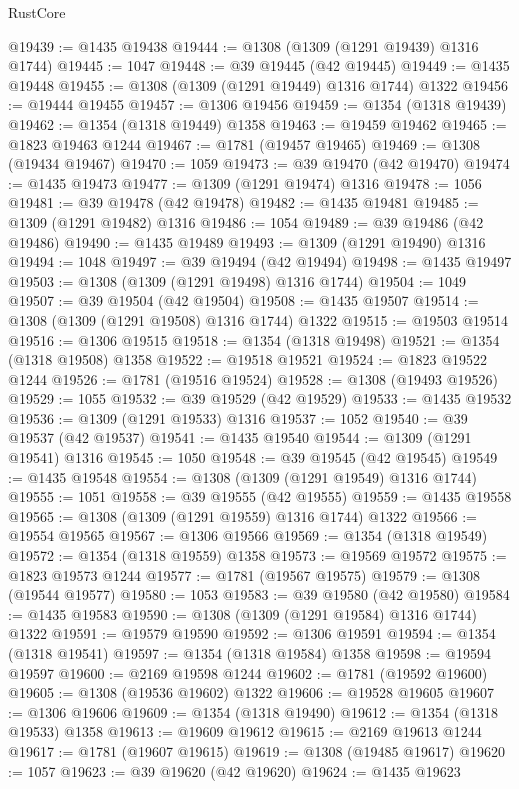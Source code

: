 \begin{lexlean}{RustCore}
\begin{coremodule}
@19439 := @1435 @19438
@19444 := @1308 (@1309 (@1291 @19439) @1316 @1744)
@19445 := 1047
@19448 := @39 @19445 (@42 @19445)
@19449 := @1435 @19448
@19455 := @1308 (@1309 (@1291 @19449) @1316 @1744) @1322
@19456 := @19444 @19455
@19457 := @1306 @19456
@19459 := @1354 (@1318 @19439)
@19462 := @1354 (@1318 @19449) @1358
@19463 := @19459 @19462
@19465 := @1823 @19463 @1244
@19467 := @1781 (@19457 @19465)
@19469 := @1308 (@19434 @19467)
@19470 := 1059
@19473 := @39 @19470 (@42 @19470)
@19474 := @1435 @19473
@19477 := @1309 (@1291 @19474) @1316
@19478 := 1056
@19481 := @39 @19478 (@42 @19478)
@19482 := @1435 @19481
@19485 := @1309 (@1291 @19482) @1316
@19486 := 1054
@19489 := @39 @19486 (@42 @19486)
@19490 := @1435 @19489
@19493 := @1309 (@1291 @19490) @1316
@19494 := 1048
@19497 := @39 @19494 (@42 @19494)
@19498 := @1435 @19497
@19503 := @1308 (@1309 (@1291 @19498) @1316 @1744)
@19504 := 1049
@19507 := @39 @19504 (@42 @19504)
@19508 := @1435 @19507
@19514 := @1308 (@1309 (@1291 @19508) @1316 @1744) @1322
@19515 := @19503 @19514
@19516 := @1306 @19515
@19518 := @1354 (@1318 @19498)
@19521 := @1354 (@1318 @19508) @1358
@19522 := @19518 @19521
@19524 := @1823 @19522 @1244
@19526 := @1781 (@19516 @19524)
@19528 := @1308 (@19493 @19526)
@19529 := 1055
@19532 := @39 @19529 (@42 @19529)
@19533 := @1435 @19532
@19536 := @1309 (@1291 @19533) @1316
@19537 := 1052
@19540 := @39 @19537 (@42 @19537)
@19541 := @1435 @19540
@19544 := @1309 (@1291 @19541) @1316
@19545 := 1050
@19548 := @39 @19545 (@42 @19545)
@19549 := @1435 @19548
@19554 := @1308 (@1309 (@1291 @19549) @1316 @1744)
@19555 := 1051
@19558 := @39 @19555 (@42 @19555)
@19559 := @1435 @19558
@19565 := @1308 (@1309 (@1291 @19559) @1316 @1744) @1322
@19566 := @19554 @19565
@19567 := @1306 @19566
@19569 := @1354 (@1318 @19549)
@19572 := @1354 (@1318 @19559) @1358
@19573 := @19569 @19572
@19575 := @1823 @19573 @1244
@19577 := @1781 (@19567 @19575)
@19579 := @1308 (@19544 @19577)
@19580 := 1053
@19583 := @39 @19580 (@42 @19580)
@19584 := @1435 @19583
@19590 := @1308 (@1309 (@1291 @19584) @1316 @1744) @1322
@19591 := @19579 @19590
@19592 := @1306 @19591
@19594 := @1354 (@1318 @19541)
@19597 := @1354 (@1318 @19584) @1358
@19598 := @19594 @19597
@19600 := @2169 @19598 @1244
@19602 := @1781 (@19592 @19600)
@19605 := @1308 (@19536 @19602) @1322
@19606 := @19528 @19605
@19607 := @1306 @19606
@19609 := @1354 (@1318 @19490)
@19612 := @1354 (@1318 @19533) @1358
@19613 := @19609 @19612
@19615 := @2169 @19613 @1244
@19617 := @1781 (@19607 @19615)
@19619 := @1308 (@19485 @19617)
@19620 := 1057
@19623 := @39 @19620 (@42 @19620)
@19624 := @1435 @19623

\end{coremodule}
\end{lexlean}
